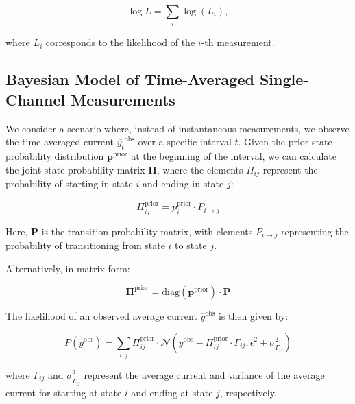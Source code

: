 \documentclass[pdflatex,sn-mathphys-num]{sn-jnl}%
\theoremstyle{thmstyleone}%
\theoremstyle{thmstyletwo}%
\theoremstyle{thmstylethree}%
\begin{document}
\begin{equation}
	\log L = \sum_i \log (L_i),
	\label{eq:loglikelihood}
\end{equation}

where \( L_i \) corresponds to the likelihood of the \( i \)-th measurement.


\subsection{Bayesian Model of Time-Averaged Single-Channel Measurements}

We consider a scenario where, instead of instantaneous measurements, we observe the time-averaged current \( \overline{y_t}^{\text{obs}} \) over a specific interval \( t \). Given the prior state probability distribution \( \mathbf{p}^{\text{prior}} \) at the beginning of the interval, we can calculate the joint state probability matrix \( \mathbf{\Pi} \), where the elements \( \Pi_{ij} \) represent the probability of starting in state \( i \) and ending in state \( j \):

\begin{equation}
	\Pi_{ij}^{\text{prior}} = p^{\text{prior}}_i \cdot P_{i \rightarrow j}
\end{equation}

Here, \( \mathbf{P} \) is the transition probability matrix, with elements \( P_{i \rightarrow j} \) representing the probability of transitioning from state \( i \) to state \( j \).

Alternatively, in matrix form:

\begin{equation}
	\mathbf{\Pi}^{\text{prior}} = \mathrm{diag}(\mathbf{p}^{\text{prior}}) \cdot \mathbf{P}
\end{equation}

The likelihood of an observed average current \( \overline{y}^{\text{obs}} \) is then given by:

\begin{equation}
	P(\overline{y}^{\text{obs}}) = \sum_{i,j} \Pi_{ij}^{\text{prior}} \cdot \mathcal{N}\left(\overline{y}^{\text{obs}} - \Pi_{ij}^{\text{prior}} \cdot \overline{\Gamma}_{ij}, \epsilon^2 + \sigma^2_{\overline{\Gamma}_{ij}}\right)
\end{equation}

where \( \overline{\Gamma}_{ij} \) and \( \sigma^2_{\overline{\Gamma}_{ij}} \) represent the average current and variance of the average current for starting at state \( i \) and ending at state \( j \), respectively.
\end{document}
